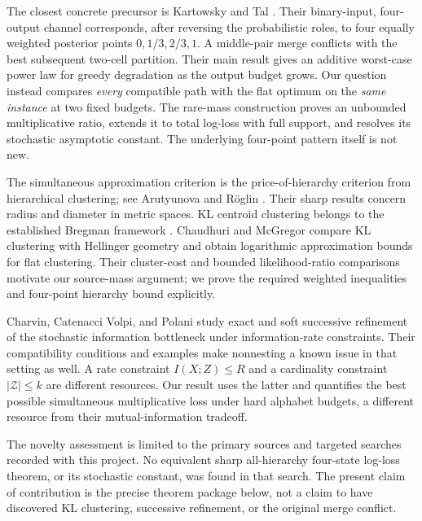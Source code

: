 \documentclass[11pt]{article}
\theoremstyle{remark}\newtheorem{remark}[theorem]{Remark}
\begin{document}
The closest concrete precursor is Kartowsky and Tal
\cite[Section III-A, Example 1]{kartowsky2019}. Their binary-input,
four-output channel corresponds, after reversing the probabilistic roles,
to four equally weighted posterior points $0,1/3,2/3,1$. A middle-pair
merge conflicts with the best subsequent two-cell partition. Their main
result gives an additive worst-case power law for greedy degradation as the
output budget grows. Our question instead compares \emph{every} compatible
path with the flat optimum on the \emph{same instance} at two fixed budgets.
The rare-mass construction proves an unbounded multiplicative ratio, extends
it to total log-loss with full support, and resolves its stochastic
asymptotic constant. The underlying four-point pattern itself is not new.

The simultaneous approximation criterion is the price-of-hierarchy criterion
from hierarchical clustering; see Arutyunova and R\"oglin
\cite[Introduction and Section 2]{arutyunova2022}. Their sharp results
concern radius and diameter in metric spaces. KL centroid clustering belongs
to the established Bregman framework \cite[Sections 2--3]{banerjee2005}.
Chaudhuri and McGregor \cite[Theorem 8 and Lemmas 12 and 18]{chaudhuri2008}
compare KL clustering with Hellinger geometry and obtain logarithmic
approximation bounds for flat clustering. Their cluster-cost and bounded
likelihood-ratio comparisons motivate our source-mass argument; we prove
the required weighted inequalities and four-point hierarchy bound explicitly.

Charvin, Catenacci Volpi, and Polani
\cite[Definition 5, Proposition 4, and Sections 2.3 and 3.2]{charvin2023} study exact and soft
successive refinement of the stochastic information bottleneck under
information-rate constraints. Their compatibility conditions and examples
make nonnesting a known issue in that setting as well. A rate constraint
$I(X;Z)\le R$ and a cardinality constraint $|\mathcal Z|\le k$ are
different resources. Our result uses the latter and quantifies the best
possible simultaneous multiplicative loss under hard alphabet budgets,
a different resource from their mutual-information tradeoff.

The novelty assessment is limited to the primary sources and targeted
searches recorded with this project. No equivalent sharp all-hierarchy
four-state log-loss theorem, or its stochastic constant, was found in that
search. The present claim of contribution is the precise theorem package
below, not a claim to have discovered KL clustering, successive refinement,
or the original merge conflict.
\end{document}
